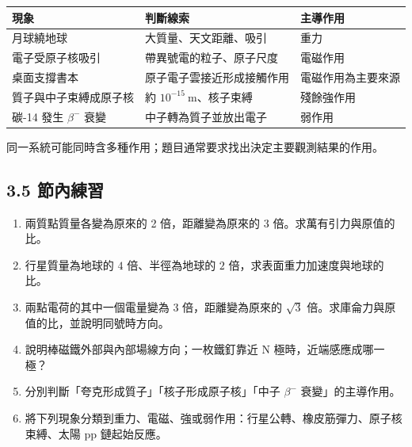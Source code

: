 \documentclass[11pt,a4paper]{article}
\newcounter{none}
\providecommand{\tightlist}{%
  \setlength{\itemsep}{0pt}\setlength{\parskip}{0pt}}
\begin{document}
{\def\LTcaptype{none} %
\begin{longtable}[]{@{}
  >{\raggedright\arraybackslash}p{}
  >{\raggedright\arraybackslash}p{}
  >{\raggedright\arraybackslash}p{}@{}}
\toprule\noalign{}
\begin{minipage}[b]{\linewidth}\raggedright
現象
\end{minipage} & \begin{minipage}[b]{\linewidth}\raggedright
判斷線索
\end{minipage} & \begin{minipage}[b]{\linewidth}\raggedright
主導作用
\end{minipage} \\
\midrule\noalign{}
\endhead
\bottomrule\noalign{}
\endlastfoot
月球繞地球 & 大質量、天文距離、吸引 & 重力 \\
電子受原子核吸引 & 帶異號電的粒子、原子尺度 & 電磁作用 \\
桌面支撐書本 & 原子電子雲接近形成接觸作用 & 電磁作用為主要來源 \\
質子與中子束縛成原子核 & 約 \(10^{-15}\ \mathrm m\)、核子束縛 & 殘餘強作用 \\
碳-14 發生 \(\beta^-\) 衰變 & 中子轉為質子並放出電子 & 弱作用 \\
\end{longtable}
}

同一系統可能同時含多種作用；題目通常要求找出決定主要觀測結果的作用。

\subsection{3.5 節內練習}\label{ux7bc0ux5167ux7df4ux7fd2-2}

\begin{enumerate}
\def\labelenumi{\arabic{enumi}.}
\tightlist
\item
  兩質點質量各變為原來的 2 倍，距離變為原來的 3 倍。求萬有引力與原值的比。
\item
  行星質量為地球的 \(4\) 倍、半徑為地球的 \(2\) 倍，求表面重力加速度與地球的比。
\item
  兩點電荷的其中一個電量變為 3 倍，距離變為原來的 \(\sqrt3\) 倍。求庫侖力與原值的比，並說明同號時方向。
\item
  說明棒磁鐵外部與內部場線方向；一枚鐵釘靠近 N 極時，近端感應成哪一極？
\item
  分別判斷「夸克形成質子」「核子形成原子核」「中子 \(\beta^-\) 衰變」的主導作用。
\item
  將下列現象分類到重力、電磁、強或弱作用：行星公轉、橡皮筋彈力、原子核束縛、太陽 pp 鏈起始反應。
\end{enumerate}
\end{document}
